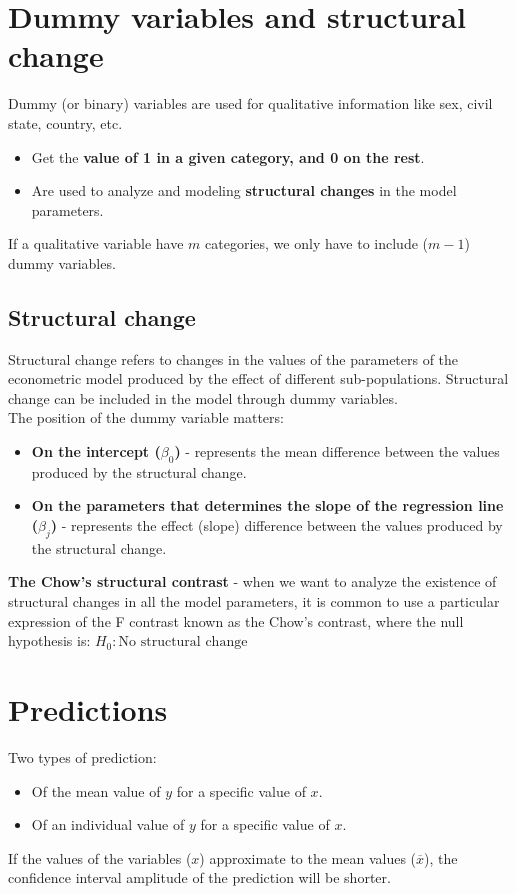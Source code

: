 \documentclass[10pt, a4paper, landscape]{extarticle}
\begin{document}
\begin{multicols}{3}
\section*{Dummy variables and structural change}
	Dummy (or binary) variables are used for qualitative information like sex, civil state, country, etc.
	\begin{itemize}[leftmargin=*]
		\item Get the \textbf{value of 1 in a given category, and 0 on the rest}.
		\item Are used to analyze and modeling \textbf{structural changes} in the model parameters.
	\end{itemize}
	If a qualitative variable have $m$ categories, we only have to include ($m-1$) dummy variables.
	\subsection*{Structural change}
		Structural change refers to changes in the values of the parameters of the econometric model produced by the effect of different sub-populations. Structural change can be included in the model through dummy variables.
		\\ The position of the dummy variable matters:
		\begin{itemize}[leftmargin=*]
			\item \textbf{On the intercept ($\beta_0$)} - represents the mean difference between the values produced by the structural change.
			\item \textbf{On the parameters that determines the slope of the regression line ($\beta_j$)} - represents the effect (slope) difference between the values produced by the structural change.
		\end{itemize}
		\textbf{The Chow's structural contrast} - when we want to analyze the existence of structural changes in all the model parameters, it is common to use a particular expression of the F contrast known as the Chow's contrast, where the null hypothesis is: $H_0: \text{No structural change}$

\section*{Predictions}
	Two types of prediction:
	\begin{itemize}[leftmargin=*]
		\item Of the mean value of $y$ for a specific value of $x$.
		\item Of an individual value of $y$ for a specific value of $x$.
	\end{itemize}
	If the values of the variables ($x$) approximate to the mean values ($\overline{x}$), the confidence interval amplitude of the prediction will be shorter. 


\end{multicols}
\end{document}
